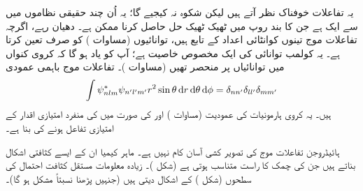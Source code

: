 یہ تفاعلات خوفناک نظر آتے ہیں لیکن شکوہ  نہ کیجیے گا؛ یہ اُن چند حقیقی نظاموں میں سے ایک ہے جن کا  بند روپ میں ٹھیک ٹھیک حل حاصل کرنا ممکن ہے۔  دھیان رہے، اگرچہ تفاعلات موج تینوں کوانٹائی اعداد کے تابع ہیں، توانائیوں (مساوات ) کو صرف  تعین کرتا ہے۔ یہ کولمب توانائی کی ایک مخصوص خاصیت ہے؛ آپ کو یاد ہو گا کہ کروی کنواں میں توانائیاں  پر منحصر تھیں (مساوات )۔ تفاعلات موج باہمی عمودی 
\begin{align}
\int\psi_{nlm}^{*}\psi_{n'l'm'}r^{2}\sin\theta\dif r\dif\theta\dif\phi=\delta_{nn'}\delta_{ll'}\delta_{mm'} 
\end{align}
ہیں۔ یہ کروی ہارمونیات کی عمودیت (مساوات )  اور  کی صورت میں   کی منفرد امتیازی  اقدار کے امتیازی تفاعل ہونے کی بنا ہے۔

ہائیڈروجن تفاعلات موج کی تصویر کشی آسان کام نہیں ہے۔  ماہر کیمیا ان کے ایسے کثافتی اشکال بناتے ہیں جن کی چمک  
کا راست متناسب ہوتی ہے (شکل )۔ زیادہ معلومات مستقل کثافت احتمال کی سطحوں (شکل ) کے اشکال دیتی ہیں (جنہیں پڑھنا  نسبتاً مشکل ہو گا)۔


